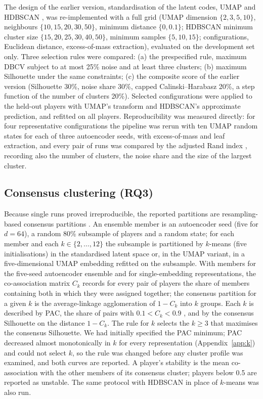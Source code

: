 The design of the earlier version, standardisation of the latent codes, UMAP \citep{mcinnes2018} and HDBSCAN \citep{campello2013,mcinnes2017hdbscan}, was re-implemented with a full grid (UMAP dimension $\{2,3,5,10\}$, neighbours $\{10,15,20,30,50\}$, minimum distance $\{0,0.1\}$; HDBSCAN minimum cluster size $\{15,20,25,30,40,50\}$, minimum samples $\{5,10,15\}$; \nGrid{} configurations, Euclidean distance, excess-of-mass extraction), evaluated on the development set only. Three selection rules were compared: (a) the prespecified rule, maximum DBCV \citep{moulavi2014} subject to at most 25\% noise and at least three clusters; (b) maximum Silhouette under the same constraints; (c) the composite score of the earlier version (Silhouette 30\%, noise share 30\%, capped Calinski--Harabasz 20\%, a step function of the number of clusters 20\%). Selected configurations were applied to the held-out players with UMAP's transform and HDBSCAN's approximate prediction, and refitted on all players. Reproducibility was measured directly: for four representative configurations the pipeline was rerun with ten UMAP random states for each of three autoencoder seeds, with excess-of-mass and leaf extraction, and every pair of runs was compared by the adjusted Rand index \citep[ARI;][]{hubert1985}, recording also the number of clusters, the noise share and the size of the largest cluster.

\subsection{Consensus clustering (RQ3)}\label{sec:consensus}

Because single runs proved irreproducible, the reported partitions are resampling-based consensus partitions \citep{monti2003,fred2005}. An ensemble member is an autoencoder seed (five for $d=64$), a random 80\% subsample of players and a random state; for each member and each $k\in\{2,\dots,12\}$ the subsample is partitioned by $k$-means (five initialisations) in the standardised latent space or, in the UMAP variant, in a five-dimensional UMAP embedding refitted on the subsample. With \nMembersAe{} members for the five-seed autoencoder ensemble and \nMembersSumm{} for single-embedding representations, the co-association matrix $C_k$ records for every pair of players the share of members containing both in which they were assigned together; the consensus partition for a given $k$ is the average-linkage agglomeration of $1-C_k$ into $k$ groups. Each $k$ is described by PAC, the share of pairs with $0.1<C_k<0.9$ \citep{senbabaoglu2014}, and by the consensus Silhouette on the distance $1-C_k$. The rule for $k$ selects the $k\ge3$ that maximises the consensus Silhouette. We had initially specified the PAC minimum; PAC decreased almost monotonically in $k$ for every representation (Appendix~\ref{app:k}) and could not select $k$, so the rule was changed before any cluster profile was examined, and both curves are reported. A player's stability is the mean co-association with the other members of its consensus cluster; players below 0.5 are reported as unstable. The same protocol with HDBSCAN in place of $k$-means was also run.

